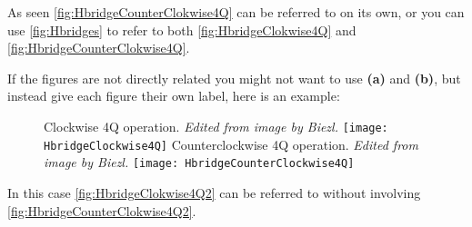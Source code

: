 As seen \autoref{fig:HbridgeCounterClokwise4Q} can be referred to on its own, or you can use \autoref{fig:Hbridges} to refer to both \autoref{fig:HbridgeClokwise4Q} and \autoref{fig:HbridgeCounterClokwise4Q}.

If the figures are not directly related you might not want to use \textbf{(a)} and \textbf{(b)}, but instead give each figure their own label, here is an example:

\begin{figure}[H]
    \captionbox
    {
      Clockwise 4Q operation.\newline
      \emph{Edited from image by Biezl.\cite{Biezl}}
      \label{fig:HbridgeClokwise4Q2}
    }
    {
      \texttt{[image: HbridgeClockwise4Q]}
    }
    \hspace{5pt}
    \captionbox
    {
      Counterclockwise 4Q operation.\newline
      \emph{Edited from image by Biezl.\cite{Biezl}}
      \label{fig:HbridgeCounterClokwise4Q2}
    }
    {
      \texttt{[image: HbridgeCounterClockwise4Q]}
    }
\end{figure}

In this case \autoref{fig:HbridgeClokwise4Q2} can be referred to without involving \autoref{fig:HbridgeCounterClokwise4Q2}.

\pagebreak